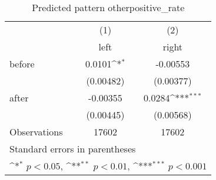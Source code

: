 \begin{table}[htbp]\centering
\def\sym#1{\ifmmode^{#1}\else\(^{#1}\)\fi}
\caption{Predicted pattern otherpositive\_rate}
\begin{tabular}{l*{2}{c}}
\hline\hline
                    &\multicolumn{1}{c}{(1)}&\multicolumn{1}{c}{(2)}\\
                    &\multicolumn{1}{c}{left}&\multicolumn{1}{c}{right}\\
\hline
before              &      0.0101\sym{*}  &    -0.00553         \\
                    &   (0.00482)         &   (0.00377)         \\
[1em]
after               &    -0.00355         &      0.0284\sym{***}\\
                    &   (0.00445)         &   (0.00568)         \\
\hline
Observations        &       17602         &       17602         \\
\hline\hline
\multicolumn{3}{l}{\footnotesize Standard errors in parentheses}\\
\multicolumn{3}{l}{\footnotesize \sym{*} \(p<0.05\), \sym{**} \(p<0.01\), \sym{***} \(p<0.001\)}\\
\end{tabular}
\end{table}
